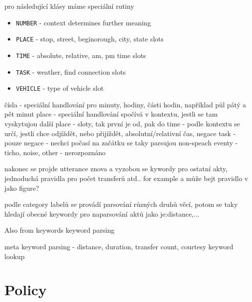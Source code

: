 pro následující klásy máme speciální rutiny

\begin{itemize}
	\item \texttt{NUMBER} - context determines further meaning
	\item \texttt{PLACE} - stop, street, beginorough, city, state slots
	\item \texttt{TIME} - absolute, relative, am, pm time slots
	\item \texttt{TASK} - weather, find connection slots
	\item \texttt{VEHICLE} - type of vehicle slot
\end{itemize}



čísla - speciální handlování pro minuty, hodiny, části hodin, například půl pátý a pět minut 
place - speciální handlování spočívá v kontextu, jestli se tam vyskytujou další place - sloty, tak první je od, pak do
time - podle kontextu se určí, jestli chce odjíždět, nebo přijíždět, absolutní/relativní čas, negace
task - pouze negace - nechci počasí
na začátku se taky parsujou non-speach eventy - ticho, noise, other - nerozpoznáno

nakonec se projde utterance znova a vyzobou se kywordy pro ostatní akty, jednoduchá pravidla pro počet transferů atd.. for example a může bejt pravidlo v jako figure?

podle category labelů se provádí parsování různých druhů věcí, potom se taky hledají obecné keywordy pro naparsování aktů jako je:distance,...

Also from keywords keyword parsing 

meta keyword parsing - distance, duration, transfer count, courtesy keyword lookup

\section{Policy}
